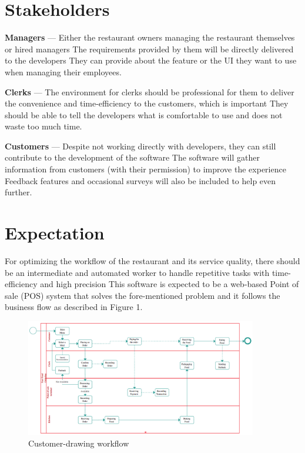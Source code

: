 \documentclass[a4paper]{article}
\numberwithin{equation}{section}
\begin{document}
\section{Stakeholders}
\textbf{Managers} --- Either the restaurant owners managing the restaurant themselves or hired managers
The requirements provided by them will be directly delivered to the developers
They can provide about the feature or the UI they want to use when managing their employees.

\textbf{Clerks} --- The environment for clerks should be professional for them to deliver the convenience and time-efficiency to the customers, which is important
They should be able to tell the developers what is comfortable to use and does not waste too much time.

\textbf{Customers} --- Despite not working directly with developers, they can still contribute to the development of the software
The software will gather information from customers (with their permission) to improve the experience
Feedback features and occasional surveys will also be included to help even further.

\section{Expectation}
For optimizing the workflow of the restaurant and its service quality, there should be an intermediate and automated worker to handle repetitive tasks with time-efficiency and high precision
This software is expected to be a web-based Point of sale (POS) system that solves the fore-mentioned problem and it follows the business flow as described in Figure 1.

\begin{figure}[H]
  \centering
  \includegraphics[width=0.9\textwidth]{customer_figure.png}
  \caption{Customer-drawing workflow}
\end{figure}
\end{document}
